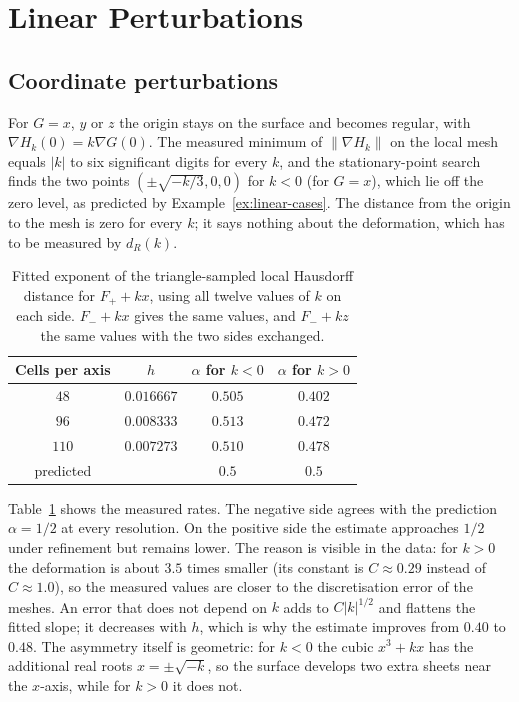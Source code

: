 \documentclass[12pt, a4paper, oneside]{book}
\theoremstyle{plain}
\theoremstyle{definition}
\theoremstyle{remark}
\begin{document}
\section{Linear Perturbations}
\label{sec:linear-results}

\subsection{Coordinate perturbations}

For $G=x$, $y$ or $z$ the origin stays on the surface and becomes regular, with
$\nabla H_k(0)=k\nabla G(0)$. The measured minimum of $\|\nabla H_k\|$ on the
local mesh equals $|k|$ to six significant digits for every $k$, and the stationary-point
search finds the two points $(\pm\sqrt{-k/3},0,0)$ for $k<0$ (for $G=x$), which
lie off the zero level, as predicted by Example~\ref{ex:linear-cases}. The
distance from the origin to the mesh is zero for every $k$; it says nothing
about the deformation, which has to be measured by $d_R(k)$.

\begin{table}[!h]
\centering
\small
\begin{tabular}{c c c c}
\toprule
Cells per axis & $h$ & $\alpha$ for $k<0$ & $\alpha$ for $k>0$ \\
\midrule
$48$  & $0.016667$ & $0.505$ & $0.402$ \\
$96$  & $0.008333$ & $0.513$ & $0.472$ \\
$110$ & $0.007273$ & $0.510$ & $0.478$ \\
\midrule
predicted & & $0.5$ & $0.5$ \\
\bottomrule
\end{tabular}
\caption[Coordinate perturbation: rates]{Fitted exponent of the triangle-sampled
local Hausdorff distance for $F_++kx$, using all twelve values of $k$ on each
side. $F_-+kx$ gives the same values, and $F_-+kz$ the same values with the two
sides exchanged.}
\label{tab:coordinate-rates}
\end{table}

Table~\ref{tab:coordinate-rates} shows the measured rates. The negative side
agrees with the prediction $\alpha=1/2$ at every resolution. On the positive
side the estimate approaches $1/2$ under refinement but remains lower. The
reason is visible in the data: for $k>0$ the deformation is about $3.5$ times
smaller (its constant is $C\approx0.29$ instead of $C\approx1.0$), so the
measured values are closer to the discretisation error of the meshes. An error
that does not depend on $k$ adds to $C|k|^{1/2}$ and flattens the fitted slope;
it decreases with $h$, which is why the estimate improves from $0.40$ to $0.48$.
The asymmetry itself is geometric: for $k<0$ the cubic $x^3+kx$ has the
additional real roots $x=\pm\sqrt{-k}$, so the surface develops two extra
sheets near the $x$-axis, while for $k>0$ it does not.
\end{document}
